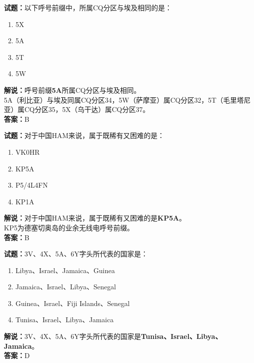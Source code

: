 \documentclass{ctexbook}
\begin{document}
\bigskip

\noindent\textbf{试题：}以下呼号前缀中，所属CQ分区与埃及相同的是：
\begin{enumerate}[leftmargin=3em]
	\item 5X
	\item 5A
	\item 5T
	\item 5W
\end{enumerate}
\noindent\textbf{解说：}呼号前缀\textbf{5A}所属CQ分区与埃及相同。\\5A（利比亚）与埃及同属CQ分区34，5W（萨摩亚）属CQ分区32，5T（毛里塔尼亚）属CQ分区35，5X（乌干达）属CQ分区37。\\\noindent\textbf{答案：}B

\bigskip


\noindent\textbf{试题：}对于中国HAM来说，属于既稀有又困难的是：
\begin{enumerate}[leftmargin=3em]
	\item VK0HR
	\item KP5A
	\item P5/4L4FN
	\item KP1A
\end{enumerate}
\noindent\textbf{解说：}对于中国HAM来说，属于既稀有又困难的是\textbf{KP5A}。\\KP5为德塞切奥岛的业余无线电呼号前缀。\\\noindent\textbf{答案：}B

\bigskip


\noindent\textbf{试题：}3V、4X、5A、6Y字头所代表的国家是：
\begin{enumerate}[leftmargin=3em]
	\item Libya、Israel、Jamaica、Guinea
	\item Jamaica、Israel、Libya、Senegal
	\item Guinea、Israel、Fiji Islands、Senegal
	\item Tunisa、Israel、Libya、Jamaica%
\end{enumerate}
\noindent\textbf{解说：}3V、4X、5A、6Y字头所代表的国家是\textbf{Tunisa、Israel、Libya、Jamaica}。\\\noindent\textbf{答案：}D

\bigskip
\end{document}
